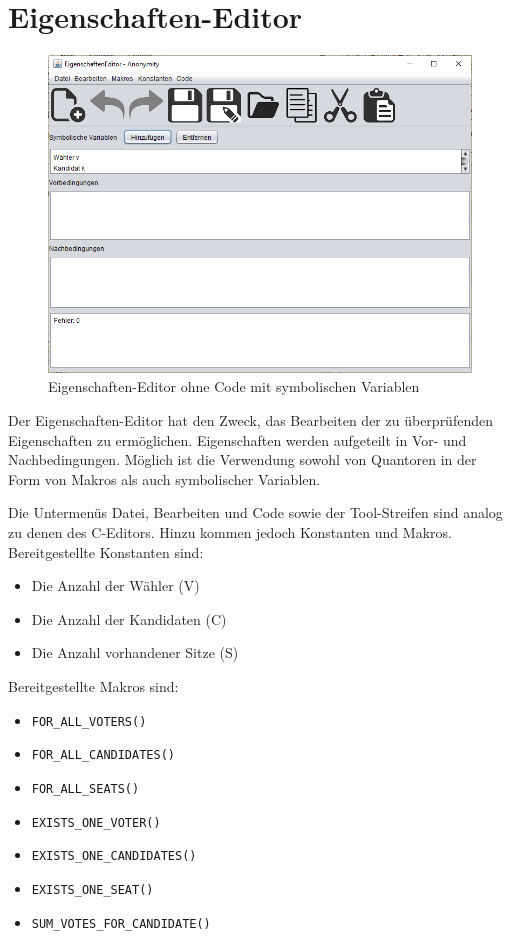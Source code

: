 \documentclass[a4paper]{scrreprt}
\begin{document}
\section{Eigenschaften-Editor}

\begin{figure}[H]
\includegraphics[scale=0.5]{raw-ohne-code.png}
\caption{Eigenschaften-Editor ohne Code mit symbolischen Variablen}
\label{Eigenschaften-Editor-ohne-code}
\end{figure}

Der Eigenschaften-Editor hat den Zweck, das Bearbeiten der zu überprüfenden Eigenschaften zu ermöglichen. Eigenschaften werden aufgeteilt in Vor- und Nachbedingungen. Möglich ist die Verwendung sowohl von Quantoren in der Form von Makros als auch symbolischer Variablen. 

Die Untermenüs Datei, Bearbeiten und Code sowie der Tool-Streifen sind analog zu denen des C-Editors. Hinzu kommen jedoch Konstanten und Makros. Bereitgestellte Konstanten sind: 

\begin{itemize}
\item Die Anzahl der Wähler (V)
\item Die Anzahl der Kandidaten (C)
\item Die Anzahl vorhandener Sitze (S)
\end{itemize}

Bereitgestellte Makros sind:

\begin{itemize}
\item \verb!FOR_ALL_VOTERS()!
\item \verb!FOR_ALL_CANDIDATES()!
\item \verb!FOR_ALL_SEATS()!
\item \verb!EXISTS_ONE_VOTER()!
\item \verb!EXISTS_ONE_CANDIDATES()!
\item \verb!EXISTS_ONE_SEAT()!
\item \verb!SUM_VOTES_FOR_CANDIDATE()!
\end{itemize}
\end{document}

